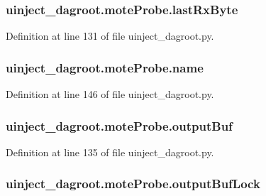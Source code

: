 \subsubsection[{\texorpdfstring{last\+Rx\+Byte}{lastRxByte}}]{\setlength{\rightskip}{0pt plus 5cm}uinject\+\_\+dagroot.\+mote\+Probe.\+last\+Rx\+Byte}\hypertarget{classuinject__dagroot_1_1mote_probe_ae50ab03320cdd296a2e4c48eb37ea9db}{}\label{classuinject__dagroot_1_1mote_probe_ae50ab03320cdd296a2e4c48eb37ea9db}


Definition at line 131 of file uinject\+\_\+dagroot.\+py.

\subsubsection[{\texorpdfstring{name}{name}}]{\setlength{\rightskip}{0pt plus 5cm}uinject\+\_\+dagroot.\+mote\+Probe.\+name}\hypertarget{classuinject__dagroot_1_1mote_probe_a54bc30c9c4c561b1adc14912f3157c38}{}\label{classuinject__dagroot_1_1mote_probe_a54bc30c9c4c561b1adc14912f3157c38}


Definition at line 146 of file uinject\+\_\+dagroot.\+py.

\subsubsection[{\texorpdfstring{output\+Buf}{outputBuf}}]{\setlength{\rightskip}{0pt plus 5cm}uinject\+\_\+dagroot.\+mote\+Probe.\+output\+Buf}\hypertarget{classuinject__dagroot_1_1mote_probe_ae2295c6bba938fcd06a87d5528f04180}{}\label{classuinject__dagroot_1_1mote_probe_ae2295c6bba938fcd06a87d5528f04180}


Definition at line 135 of file uinject\+\_\+dagroot.\+py.

\subsubsection[{\texorpdfstring{output\+Buf\+Lock}{outputBufLock}}]{\setlength{\rightskip}{0pt plus 5cm}uinject\+\_\+dagroot.\+mote\+Probe.\+output\+Buf\+Lock}\hypertarget{classuinject__dagroot_1_1mote_probe_a57ec5bfce48e23bf2b5819ba014579e0}{}\label{classuinject__dagroot_1_1mote_probe_a57ec5bfce48e23bf2b5819ba014579e0}


